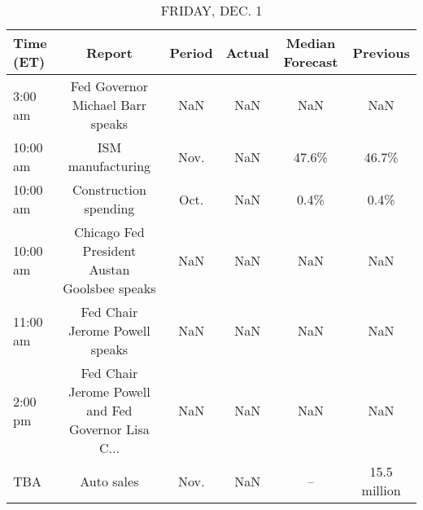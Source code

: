 \documentclass{article}%
\begin{document}
\begin{table}[htbp]%
\caption{FRIDAY, DEC. 1}%
\centering%
\begin{adjustbox}{width=1\textwidth}%
\begin{tabular}{lccccc}
\toprule
Time (ET) &                                             Report & Period & Actual & Median Forecast &     Previous \\
\midrule
  3:00 am &                   Fed Governor Michael Barr speaks &    NaN &    NaN &             NaN &          NaN \\
 10:00 am &                                  ISM manufacturing &   Nov. &    NaN &           47.6\% &        46.7\% \\
 10:00 am &                              Construction spending &   Oct. &    NaN &            0.4\% &         0.4\% \\
 10:00 am &       Chicago Fed President Austan Goolsbee speaks &    NaN &    NaN &             NaN &          NaN \\
 11:00 am &                     Fed Chair Jerome Powell speaks &    NaN &    NaN &             NaN &          NaN \\
  2:00 pm & Fed Chair Jerome Powell and Fed Governor Lisa C... &    NaN &    NaN &             NaN &          NaN \\
      TBA &                                         Auto sales &   Nov. &    NaN &              -- & 15.5 million \\
\bottomrule
\end{tabular}
%
\end{adjustbox}%
\end{table}
\end{document}
